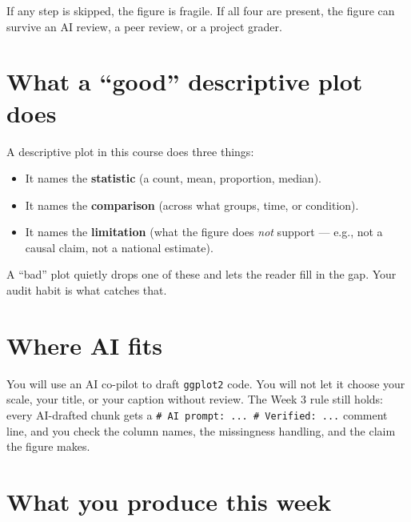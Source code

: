 \documentclass[
  letterpaper,
  DIV=11,
  numbers=noendperiod,
  oneside]{scrreprt}
\providecommand{\tightlist}{%
  \setlength{\itemsep}{0pt}\setlength{\parskip}{0pt}}
\begin{document}
If any step is skipped, the figure is fragile. If all four are present,
the figure can survive an AI review, a peer review, or a project grader.

\section*{What a ``good'' descriptive plot
does}\label{what-a-good-descriptive-plot-does}


A descriptive plot in this course does three things:

\begin{itemize}
\tightlist
\item
  It names the \textbf{statistic} (a count, mean, proportion, median).
\item
  It names the \textbf{comparison} (across what groups, time, or
  condition).
\item
  It names the \textbf{limitation} (what the figure does \emph{not}
  support --- e.g., not a causal claim, not a national estimate).
\end{itemize}

A ``bad'' plot quietly drops one of these and lets the reader fill in
the gap. Your audit habit is what catches that.

\section*{Where AI fits}\label{where-ai-fits}


You will use an AI co-pilot to draft \texttt{ggplot2} code. You will not
let it choose your scale, your title, or your caption without review.
The Week 3 rule still holds: every AI-drafted chunk gets a
\texttt{\#\ AI\ prompt:\ ...\ \#\ Verified:\ ...} comment line, and you
check the column names, the missingness handling, and the claim the
figure makes.

\section*{What you produce this week}\label{what-you-produce-this-week}

\end{document}
